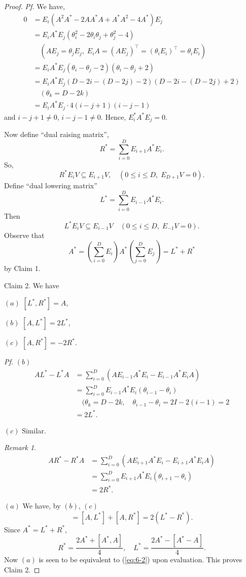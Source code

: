 \documentclass[
]{book}
\theoremstyle{definition}
\theoremstyle{definition}
\theoremstyle{definition}
\theoremstyle{definition}
\theoremstyle{remark}
\newtheorem*{remark}{Remark}
\begin{document}
\begin{proof}
\emph{Pf.} We have,
\begin{align}
0 & = E_i(A^2A^* - 2AA^*A + A^*A^2 - 4A^*)E_j\\
& = E_iA^*E_j(\theta_i^2 - 2\theta_i\theta_j + \theta_j^2 - 4)\\
& \quad (AE_j = \theta_jE_j, \; E_iA = (AE_j)^\top = (\theta_iE_i)^\top = \theta_iE_i)\\
& = E_iA^*E_j(\theta_i - \theta_j -2)(\theta_i - \theta_j + 2)\\
& = E_iA^*E_j(D-2i - (D-2j)-2)(D-2i - (D-2j) + 2)\\
& \quad (\theta_k = D-2k)\\
& = E_iA^*E_j \cdot 4(i-j+1)(i-j-1)
\end{align}
and \(i-j+1 \neq 0\), \(i-j-1\neq 0\).
Hence, \(E_i^*A^*E_j = 0\).

Now define ``dual raising matrix'',
\[R^* = \sum_{i=0}^D E_{i+1}A^*E_i.\]
So,
\[R^*E_iV \subseteq E_{i+1}V, \quad (0\leq i\leq D, \; E_{D+1}V = 0).\]
Define ``dual lowering matrix''
\[L^* = \sum_{i=0}^D E_{i-1}A^*E_i.\]
Then
\[L^*E_iV \subseteq E_{i-1}V \quad (0\leq i\leq D, \; E_{-1}V = 0).\]
Observe that
\[A^* = \left(\sum_{i=0}^DE_i\right)A^*\left(\sum_{j=0}^DE_j\right) = L^* + R^*\]
by Claim 1.

Claim 2. We have

\((a)\) \([L^*, R^*] = A\),

\((b)\) \([A, L^*] = 2L^*\),

\((c)\) \([A, R^*] = -2R^*\).

\emph{Pf.}
\((b)\)
\begin{align}
AL^* - L^*A & = \sum_{i=0}^D(AE_{i-1}A^*E_i - E_{i-1}A^*E_iA)\\
& = \sum_{i=0}^D E_{i-1}A^*E_i (\theta_{i-1} - \theta_i)\\
& \quad (\theta_k = D-2k, \quad \theta_{i-1}- \theta_i = 2I - 2(i-1) = 2\\
& = 2L^*.
\end{align}

\((c)\) Similar.

\begin{remark}
\begin{align}
AR^* - R^*A & = \sum_{i=0}^D (AE_{i+1}A^*E_i - E_{i+1}A^*E_iA)\\
& = \sum_{i=0}^D E_{i+1}A^*E_i (\theta_{i+1} - \theta_i)\\
& = 2R^*.
\end{align}
\end{remark}

\((a)\) We have, by \((b)\), \((c)\)
\begin{equation}
[A, A^*] = [A, L^*] + [A, R^*] = 2(L^* - R^*).
\end{equation}
Since \(A^* = L^* + R^*\),
\[R^* = \frac{2A^* + [A^*, A]}{4}, \quad L^* = \frac{2A^* - [A^* - A]}{4}.\]
Now \((a)\) is seen to be equivalent to (\eqref{eq:6-2}) upon evaluation.
This proves Claim 2.


\end{proof}
\end{document}
